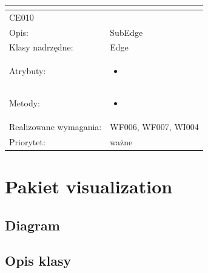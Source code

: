 \documentclass[a4paper,10pt]{article}
\begin{document}
\begin{center}
\begin{longtable}{|m{3cm}|m{9cm}|}
\multicolumn{2}{c}{} \\
 \hline

CE010 &  \\ \hline
Opis: & SubEdge    \\ \hline
Klasy nadrzędne: & Edge    \\ \hline
Atrybuty: & \begin{itemize}
 \item 
\end{itemize}
 \\ \hline
Metody: & \begin{itemize}
 \item 
\end{itemize}
  \\ \hline
Realizowane wymagania: & WF006, WF007, WI004 \\ \hline
Priorytet: & ważne  \\ \hline



\end{longtable}

\end{center}

\section{Pakiet visualization }

\subsection{Diagram}


\subsection{Opis klasy}
\end{document}
